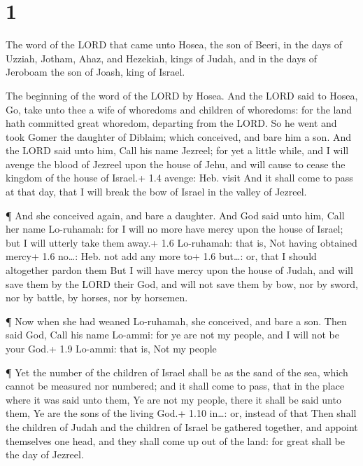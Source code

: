 \hypertarget{section}{%
\section{1}\label{section}}

 The word of the LORD that came unto Hosea, the son of
Beeri, in the days of Uzziah, Jotham, Ahaz, and Hezekiah, kings of
Judah, and in the days of Jeroboam the son of Joash, king of Israel.

 The beginning of the word of the LORD by Hosea. And the
LORD said to Hosea, Go, take unto thee a wife of whoredoms and children
of whoredoms: for the land hath committed great whoredom, departing from
the LORD.  So he went and took Gomer the daughter of
Diblaim; which conceived, and bare him a son.  And the LORD
said unto him, Call his name Jezreel; for yet a little while, and I will
avenge the blood of Jezreel upon the house of Jehu, and will cause to
cease the kingdom of the house of Israel.+ 1.4 avenge: Heb. visit
 And it shall come to pass at that day, that I will break
the bow of Israel in the valley of Jezreel.

 ¶ And she conceived again, and bare a daughter. And God
said unto him, Call her name Lo-ruhamah: for I will no more have mercy
upon the house of Israel; but I will utterly take them away.+ 1.6
Lo-ruhamah: that is, Not having obtained mercy+ 1.6 no\ldots: Heb. not
add any more to+ 1.6 but\ldots: or, that I should altogether pardon them
 But I will have mercy upon the house of Judah, and will
save them by the LORD their God, and will not save them by bow, nor by
sword, nor by battle, by horses, nor by horsemen.

 ¶ Now when she had weaned Lo-ruhamah, she conceived, and
bare a son.  Then said God, Call his name Lo-ammi: for ye
are not my people, and I will not be your God.+ 1.9 Lo-ammi: that is,
Not my people

 ¶ Yet the number of the children of Israel shall be as the
sand of the sea, which cannot be measured nor numbered; and it shall
come to pass, that in the place where it was said unto them, Ye are not
my people, there it shall be said unto them, Ye are the sons of the
living God.+ 1.10 in\ldots: or, instead of that  Then shall
the children of Judah and the children of Israel be gathered together,
and appoint themselves one head, and they shall come up out of the land:
for great shall be the day of Jezreel.

